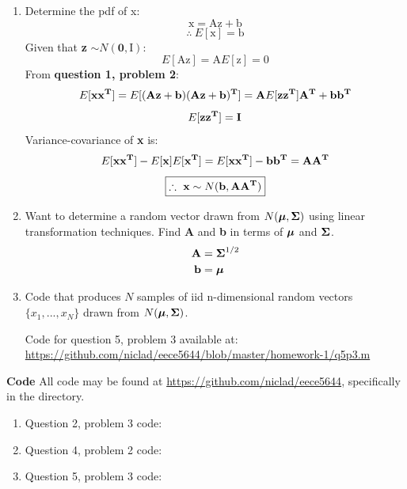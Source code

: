 \documentclass[12pt,A4]{article}
\begin{document}
\begin{enumerate}
    \item Determine the pdf of x:
    $$\boldsymbol{\mathrm{x}} = \boldsymbol{\mathrm{Az}} + \boldsymbol{\mathrm{b}}$$
    $$\therefore \ E[\boldsymbol{\mathrm{x}}]=\boldsymbol{\mathrm{b}}$$
    Given that \textbf{z} $\sim N(\boldsymbol{0}, \boldsymbol{\mathrm{I}})$:
    $$E[\boldsymbol{\mathrm{Az}}]=\boldsymbol{\mathrm{A}}E[\boldsymbol{\mathrm{z}}]=0$$
    From \textbf{question 1, problem 2}:
    $$E[\boldsymbol{\mathrm{xx^T}}]=E[(\boldsymbol{\mathrm{Az}}+\boldsymbol{\mathrm{b}})(\boldsymbol{\mathrm{Az}}+\boldsymbol{\mathrm{b}})^{\boldsymbol{\mathrm{T}}}]=\boldsymbol{\mathrm{A}}E[\boldsymbol{\mathrm{zz^T}}]\boldsymbol{\mathrm{A^T}}+\boldsymbol{\mathrm{bb^T}}$$
    $$E[\boldsymbol{\mathrm{zz^T}}]=\boldsymbol{\mathrm{I}}$$
    Variance-covariance of \textbf{x} is:
    $$E[\boldsymbol{\mathrm{xx^T}}]-E[\boldsymbol{\mathrm{x}}]E[\boldsymbol{\mathrm{x^T}}]=E[\boldsymbol{\mathrm{xx^T}}]-\boldsymbol{\mathrm{bb^T}}=\boldsymbol{\mathrm{AA^T}}$$
    $$\boxed{\therefore \ \boldsymbol{\mathrm{x}} \sim N(\boldsymbol{\mathrm{b}}, \boldsymbol{\mathrm{AA^T}})}$$
    
    \item Want to determine a random vector drawn from $N(\boldsymbol{\mathrm{\mu}}, \boldsymbol{\mathrm{\Sigma}})$ using linear transformation techniques. Find \textbf{A} and \textbf{b} in terms of $\boldsymbol{\mathrm{\mu}}$ and $\boldsymbol{\mathrm{\Sigma}}$.
    \begin{align*}
        \boldsymbol{\mathrm{A}}&=\boldsymbol{\mathrm{\Sigma}}^{1/2}\\
        \boldsymbol{\mathrm{b}}&=\boldsymbol{\mathrm{\mu}}
    \end{align*}
    
    \item Code that produces $N$ samples of iid n-dimensional random vectors $\{x_1,...,x_N\}$ drawn from $N(\boldsymbol{\mathrm{\mu}}, \boldsymbol{\mathrm{\Sigma}})$.
    \begin{center}
        Code for question 5, problem 3 available at: \url{https://github.com/niclad/eece5644/blob/master/homework-1/q5p3.m}
    \end{center}
    \end{enumerate}
    \newpage
    
\textbf{Code}
All code may be found at \url{https://github.com/niclad/eece5644}, specifically in the \href{https://github.com/niclad/eece5644/tree/master/homework-1}{} directory.
\begin{enumerate}
    \item Question 2, problem 3 code:
    
    \item Question 4, problem 2 code:
    
    \item Question 5, problem 3 code:
    
\end{enumerate}
\end{document}
